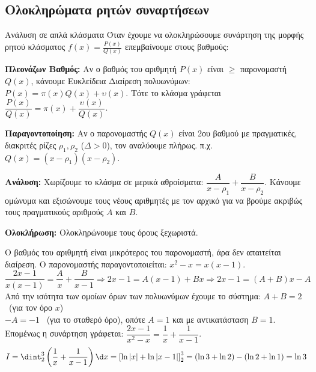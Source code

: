 \subsection{Ολοκληρώματα ρητών συναρτήσεων}
\begin{askhsh}{Ανάλυση σε απλά κλάσματα}
Όταν έχουμε να ολοκληρώσουμε συνάρτηση της μορφής ρητού κλάσματος $f(x) = \frac{P(x)}{Q(x)}$ επεμβαίνουμε στους βαθμούς:

\bhmata
\begin{bhma}
    \item \textbf{Πλεονάζων Βαθμός:} Αν ο βαθμός του αριθμητή $P(x)$ είναι $ \ge $ παρονομαστή $Q(x)$, κάνουμε Ευκλείδεια Διαίρεση πολυωνύμων: $P(x) = \pi(x)Q(x) + \upsilon(x)$. Τότε το κλάσμα γράφεται $\dfrac{P(x)}{Q(x)} = \pi(x) + \dfrac{\upsilon(x)}{Q(x)}$.
    \item \textbf{Παραγοντοποίηση:} Αν ο παρονομαστής $Q(x)$ είναι 2ου βαθμού με πραγματικές, διακριτές ρίζες $\rho_1, \rho_2$ ($\Delta > 0$), τον αναλύουμε πλήρως. π.χ. $Q(x) = (x-\rho_1)(x-\rho_2)$.
    \item \textbf{Ανάλυση:} Χωρίζουμε το κλάσμα σε μερικά αθροίσματα: $\dfrac{A}{x-\rho_1} + \dfrac{B}{x-\rho_2}$. Κάνουμε ομώνυμα και εξισώνουμε τους νέους αριθμητές με τον αρχικό για να βρούμε ακριβώς τους πραγματικούς αριθμούς $A$ και $B$.
    \item \textbf{Ολοκλήρωση:} Ολοκληρώνουμε τους όρους ξεχωριστά.
\end{bhma}
\end{askhsh}


\lysh
Ο βαθμός του αριθμητή είναι μικρότερος του παρονομαστή, άρα δεν απαιτείται διαίρεση. Ο παρονομαστής παραγοντοποιείται: $x^2 - x = x(x-1)$.
\[ \dfrac{2x - 1}{x(x-1)} = \dfrac{A}{x} + \dfrac{B}{x-1} \Rightarrow 2x - 1 = A(x-1) + Bx \Rightarrow 2x - 1 = (A+B)x - A \]
Από την ισότητα των ομοίων όρων των πολυωνύμων έχουμε το σύστημα:
$A+B = 2$ \ (για τον όρο $x$)\\ 
$-A = -1$ \ (για το σταθερό όρο), 
οπότε $A = 1$ και με αντικατάσταση $B = 1$.
Επομένως η συνάρτηση γράφεται: $\dfrac{2x-1}{x^2-x} = \dfrac{1}{x} + \dfrac{1}{x-1}$.
\[ I = \dint_2^3 \left( \frac{1}{x} + \frac{1}{x-1} \right) \d x = \left[\ln|x| + \ln|x-1|\right]_2^3 = (\ln 3 + \ln 2) - (\ln 2 + \ln 1) = \ln 3 \]


